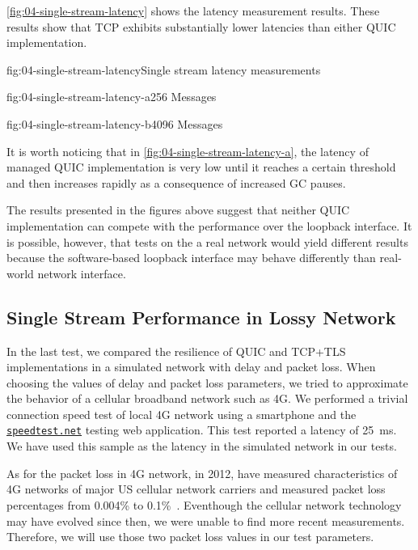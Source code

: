\autoref{fig:04-single-stream-latency} shows the latency measurement results. These results show
that TCP exhibits substantially lower latencies than either QUIC implementation.

\begin{myFigure}{fig:04-single-stream-latency}{Single stream latency measurements}
\begin{mySubfigure}{0.49\linewidth}{fig:04-single-stream-latency-a}{\SI{256}{\byte} Messages}
\footnotesize

\end{mySubfigure}
\begin{mySubfigure}{0.49\linewidth}{fig:04-single-stream-latency-b}{\SI{4096}{\byte} Messages}
\footnotesize

\end{mySubfigure}
\end{myFigure}

It is worth noticing that in \autoref{fig:04-single-stream-latency-a}, the latency of managed QUIC
implementation is very low until it reaches a certain threshold and then increases rapidly as a
consequence of increased GC pauses.

The results presented in the figures above suggest that neither QUIC implementation can compete with
the \SslStream{} performance over the loopback interface. It is possible, however, that tests on the
a real network would yield different results because the software-based loopback interface may
behave differently than real-world network interface.


\subsection{Single Stream Performance in Lossy Network}

In the last test, we compared the resilience of QUIC and TCP+TLS implementations in a simulated
network with delay and packet loss. When choosing the values of delay and packet loss parameters, we
tried to approximate the behavior of a cellular broadband network such as 4G\@. We performed a
trivial connection speed test of local 4G network using a smartphone and the
\href{https://speedtest.net}{\texttt{speedtest.net}} testing web application. This test reported a
latency of \SI{25}{\milli\second}. We have used this sample as the latency in the simulated network
in our tests.

As for the packet loss in 4G network, in 2012, \citeauthor{measuring4G} have measured
characteristics of 4G networks of major US cellular network carriers and measured packet loss
percentages from 0.004\% to 0.1\%~\cite{measuring4G}. Eventhough the cellular network technology may
have evolved since then, we were unable to find more recent measurements. Therefore, we will use
those two packet loss values in our test parameters.

